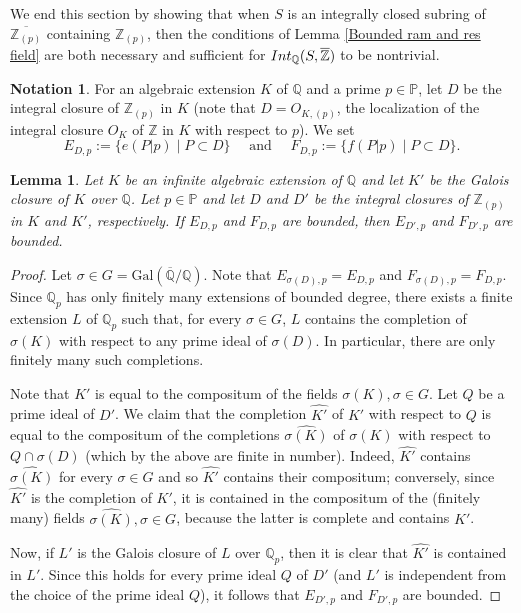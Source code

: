 \documentclass{article}
\newtheorem{Lem}[equation]{Lemma}
\theoremstyle{definition}\newtheorem{Def}[equation]{Definition}
\theoremstyle{definition}\newtheorem{Ques}[equation]{Question}
\theoremstyle{definition}\newtheorem{Conj}[equation]{Conjecture}
\theoremstyle{definition}\newtheorem{Not}[equation]{Notation}
\newcommand{\Q}{\mathbb{Q}}
\newcommand{\oQ}{\overline{\Q}}
\newcommand{\oZ}{\overline{\Z}}
\newcommand{\Z}{\mathbb{Z}}
\newcommand{\Int}{\textnormal{Int}}
\newcommand{\IntQ}{\Int_{\Q}}
\newcommand{\Gal}{\text{Gal}}
\newcommand{\PP}{\mathbb{P}}
\numberwithin{equation}{section}
\begin{document}
We end this section by showing that when $S$ is an integrally closed subring of $\overline{\Z_{(p)}}$ containing $\Z_{(p)}$, then the conditions of Lemma \ref{Bounded ram and res field} are both necessary and sufficient for $\IntQ(S,\oZ)$ to be nontrivial.

\begin{Not}
For an algebraic extension $K$ of $\Q$ and a prime $p\in\PP$, let $D$ be the integral closure of $\Z_{(p)}$ in $K$ (note that $D=O_{K,(p)}$, the localization of the integral closure $O_K$ of $\Z$ in $K$ with respect to $p$). We set
$$E_{D,p}:=\{e(P|p) \mid P\subset D\} \quad \text{ and } \quad F_{D,p}:=\{f(P|p) \mid P\subset D\}.$$
\end{Not}

\begin{Lem}\label{bounded degree Galois closure}
Let $K$ be an infinite algebraic extension of $\Q$ and let $K'$ be the Galois closure of $K$ over $\Q$. Let $p\in\PP$ and let $D$ and $D'$ be the integral closures of $\Z_{(p)}$ in $K$ and $K'$, respectively. If $E_{D,p}$ and $F_{D,p}$ are bounded, then $E_{D',p}$ and $F_{D',p}$ are bounded.
\end{Lem}
\begin{proof}
Let $\sigma\in G=\Gal(\oQ/\Q)$. Note that $E_{\sigma(D),p}=E_{D,p}$ and $F_{\sigma(D),p}=F_{D,p}$. Since $\Q_p$ has only finitely many extensions of bounded degree, there exists a finite extension $L$ of $\Q_p$ such that, for every $\sigma\in G$, $L$ contains the completion of $\sigma(K)$ with respect to any prime ideal of $\sigma(D)$. In particular, there are only finitely many such completions.

Note that $K'$ is equal to the compositum of the fields $\sigma(K), \sigma\in G$. Let $Q$ be a prime ideal of $D'$. We claim that the completion $\widehat{K'}$ of $K'$ with respect to $Q$ is equal to the compositum of the completions $\widehat{\sigma(K)}$ of $\sigma(K)$ with respect to $Q\cap\sigma(D)$ (which by the above are finite in number). Indeed, $\widehat{K'}$ contains $\widehat{\sigma(K)}$ for every $\sigma\in G$ and so $\widehat{K'}$ contains their compositum; conversely, since $\widehat{K'}$ is the completion of $K'$, it is contained in the compositum of the (finitely many) fields $\widehat{\sigma(K)},\sigma\in G$, because the latter is complete and contains $K'$.

Now, if $L'$ is the Galois closure of $L$ over $\Q_p$, then it is clear that $\widehat{K'}$ is contained in $L'$. Since this holds for every prime ideal $Q$ of $D'$ (and $L'$ is independent from the choice of the prime ideal $Q$), it follows that $E_{D',p}$ and $F_{D',p}$ are bounded.
\end{proof}
\end{document}
